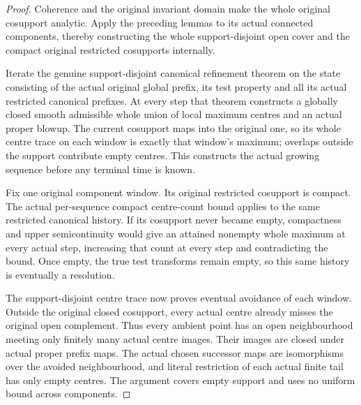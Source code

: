 \begin{proof}
Coherence and the original invariant domain make the whole original
cosupport analytic. Apply the preceding lemmas to its actual connected
components, thereby constructing the whole support-disjoint open cover
and the compact original restricted cosupports internally.

Iterate the genuine support-disjoint canonical refinement theorem on
the state consisting of the actual original global prefix, its test
property and all its actual restricted canonical prefixes. At every
step that theorem constructs a globally closed smooth admissible whole
union of local maximum centres and an actual proper blowup. The current
cosupport maps into the original one, so its whole centre trace on each
window is exactly that window's maximum; overlaps outside the support
contribute empty centres. This constructs the actual growing sequence
before any terminal time is known.

Fix one original component window. Its original restricted cosupport
is compact. The actual per-sequence compact centre-count bound applies
to the same restricted canonical history. If its cosupport never became
empty, compactness and upper semicontinuity would give an attained
nonempty whole maximum at every actual step, increasing that count at
every step and contradicting the bound. Once empty, the true test
transforms remain empty, so this same history is eventually a resolution.

The support-disjoint centre trace now proves eventual avoidance of each
window. Outside the original closed cosupport, every actual centre
already misses the original open complement. Thus every ambient point
has an open neighbourhood meeting only finitely many actual centre
images. Their images are closed under actual proper prefix maps.
The actual chosen successor maps are isomorphisms over the avoided
neighbourhood, and literal restriction of each actual finite tail has
only empty centres. The argument covers empty support and uses no
uniform bound across components.
\end{proof}

